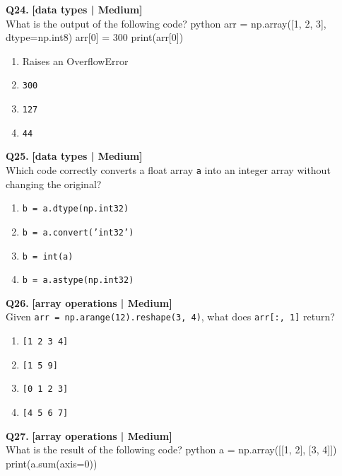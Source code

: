 \noindent\textbf{Q24.} \hfill {\small\color{LPUOrange}\textbf{[data types | Medium]}}\\[2pt]
What is the output of the following code? 
 python 
 arr = np.array([1, 2, 3], dtype=np.int8) 
 arr[0] = 300 
 print(arr[0])

\begin{enumerate}[label=(\alph*),topsep=2pt,itemsep=1pt,partopsep=0pt,parsep=0pt]
    \item \relax Raises an OverflowError
    \item \relax \texttt{300}
    \item \relax \texttt{127}
    \item \relax \texttt{44}
\end{enumerate}
\vspace{2mm}

\noindent\textbf{Q25.} \hfill {\small\color{LPUOrange}\textbf{[data types | Medium]}}\\[2pt]
Which code correctly converts a float array \texttt{a} into an integer array without changing the original?

\begin{enumerate}[label=(\alph*),topsep=2pt,itemsep=1pt,partopsep=0pt,parsep=0pt]
    \item \relax \texttt{b = a.dtype(np.int32)}
    \item \relax \texttt{b = a.convert('int32')}
    \item \relax \texttt{b = int(a)}
    \item \relax \texttt{b = a.astype(np.int32)}
\end{enumerate}
\vspace{2mm}

\noindent\textbf{Q26.} \hfill {\small\color{LPUOrange}\textbf{[array operations | Medium]}}\\[2pt]
Given \texttt{arr = np.arange(12).reshape(3, 4)}, what does \texttt{arr[:, 1]} return?

\begin{enumerate}[label=(\alph*),topsep=2pt,itemsep=1pt,partopsep=0pt,parsep=0pt]
    \item \relax \texttt{[1 2 3 4]}
    \item \relax \texttt{[1 5 9]}
    \item \relax \texttt{[0 1 2 3]}
    \item \relax \texttt{[4 5 6 7]}
\end{enumerate}
\vspace{2mm}

\noindent\textbf{Q27.} \hfill {\small\color{LPUOrange}\textbf{[array operations | Medium]}}\\[2pt]
What is the result of the following code? 
 python 
 a = np.array([[1, 2], [3, 4]]) 
 print(a.sum(axis=0))

